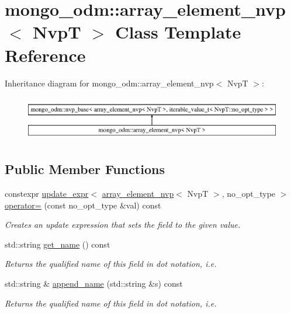 \hypertarget{classmongo__odm_1_1array__element__nvp}{}\section{mongo\+\_\+odm\+:\+:array\+\_\+element\+\_\+nvp$<$ NvpT $>$ Class Template Reference}
\label{classmongo__odm_1_1array__element__nvp}
Inheritance diagram for mongo\+\_\+odm\+:\+:array\+\_\+element\+\_\+nvp$<$ NvpT $>$\+:\begin{figure}[H]
\begin{center}
\leavevmode
\includegraphics[height=1.989343cm]{classmongo__odm_1_1array__element__nvp}
\end{center}
\end{figure}
\subsection*{Public Member Functions}
\begin{DoxyCompactItemize}
\item 
constexpr \hyperlink{classmongo__odm_1_1update__expr}{update\+\_\+expr}$<$ \hyperlink{classmongo__odm_1_1array__element__nvp}{array\+\_\+element\+\_\+nvp}$<$ NvpT $>$, no\+\_\+opt\+\_\+type $>$ \hyperlink{classmongo__odm_1_1array__element__nvp_a92f296a58c7eeeda4aa847c7e98308a8}{operator=} (const no\+\_\+opt\+\_\+type \&val) const \hypertarget{classmongo__odm_1_1array__element__nvp_a92f296a58c7eeeda4aa847c7e98308a8}{}\label{classmongo__odm_1_1array__element__nvp_a92f296a58c7eeeda4aa847c7e98308a8}

\begin{DoxyCompactList}\small\item\em Creates an update expression that sets the field to the given value. \end{DoxyCompactList}\item 
std\+::string \hyperlink{classmongo__odm_1_1array__element__nvp_a910b3a4d344ad4bcecfb83bd4105f7e3}{get\+\_\+name} () const 
\begin{DoxyCompactList}\small\item\em Returns the qualified name of this field in dot notation, i.\+e. \end{DoxyCompactList}\item 
std\+::string \& \hyperlink{classmongo__odm_1_1array__element__nvp_ac3c14d806529b80826f97d4df17ff9b3}{append\+\_\+name} (std\+::string \&s) const 
\begin{DoxyCompactList}\small\item\em Returns the qualified name of this field in dot notation, i.\+e. \end{DoxyCompactList}\end{DoxyCompactItemize}


